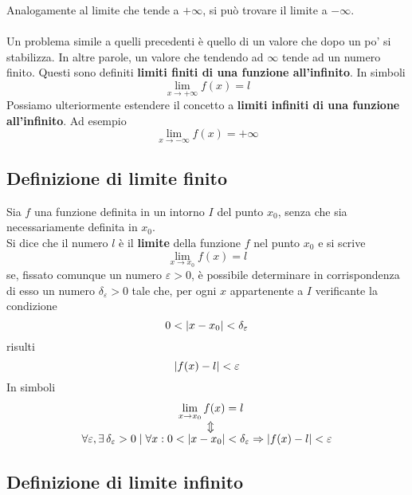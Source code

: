 Analogamente al limite che tende a $+\infty$, si può trovare il limite a $-\infty$.\\\\
Un problema simile a quelli precedenti è quello di un valore che dopo un po' si stabilizza. In altre
parole, un valore che tendendo ad $\infty$ tende ad un numero finito. Questi sono definiti \textbf{
limiti finiti di una funzione all'infinito}. In simboli
\begin{equation*}
\lim\limits_{x\to+\infty}f(x)=l
\end{equation*}
Possiamo ulteriormente estendere il concetto a \textbf{limiti infiniti di una funzione all'infinito}.
Ad esempio
\begin{equation*}
\lim\limits_{x\to-\infty}f(x)=+\infty
\end{equation*}


\subsection{Definizione di limite finito}
\begin{definizioneLimiteFinito}
	Sia $f$ una funzione definita in un intorno $I$ del punto $x_0$, senza che sia necessariamente
	definita in $x_0$.\\
	Si dice che il numero $l$ è il \textbf{limite} della funzione $f$ nel punto $x_0$ e si scrive
	\begin{equation*}
	\lim\limits_{x\to x_0}f(x)=l
	\end{equation*}
	se, fissato comunque un numero $\varepsilon>0$, è possibile determinare in corrispondenza di esso 
	un numero $\delta_\varepsilon>0$ tale che, per ogni $x$ appartenente a $I$ verificante la 
	condizione
	\begin{equation*}
	0<\lvert x-x_0\rvert<\delta_\varepsilon
	\end{equation*}
	risulti
	\begin{equation*}
	\lvert f(x)-l\rvert<\varepsilon
	\end{equation*}
	In simboli
	\begin{align*}
	\lim\limits_{x\to x_0} f(x) &= l\\
	\ArrowBetweenLines
	\forall \varepsilon, \exists\,\delta_\varepsilon>0\mid\forall x: 0<\vert x-x_0\vert 
	&<\delta_\varepsilon \Rightarrow \vert f(x) - l\vert < \varepsilon
	\end{align*}
\end{definizioneLimiteFinito}

\subsection{Definizione di limite infinito}
